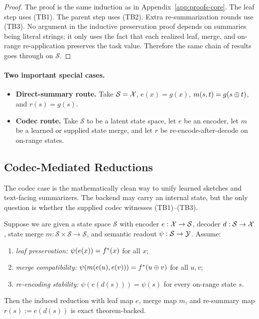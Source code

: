 \begin{proof}
The proof is the same induction as in Appendix~\ref{app:proofs-core}. The leaf
step uses \textup{(TB1)}. The parent step uses \textup{(TB2)}. Extra
re-summarization rounds use \textup{(TB3)}. No argument in the inductive
preservation proof depends on summaries being literal strings; it only uses the
fact that each realized leaf, merge, and on-range re-application preserves the
task value. Therefore the same chain of results goes through on $\mathcal{S}$.
\end{proof}

\paragraph{Two important special cases.}
\begin{itemize}[nosep]
    \item \textbf{Direct-summary route.} Take $\mathcal{S}=\mathcal{X}$,
    $e(x)=g(x)$, $m(s,t)=g(s\oplus t)$, and $r(s)=g(s)$.
    \item \textbf{Codec route.} Take $\mathcal{S}$ to be a latent state space,
    let $e$ be an encoder, let $m$ be a learned or supplied state merge, and
    let $r$ be re-encode-after-decode on on-range states.
\end{itemize}

\subsection{Codec-Mediated Reductions}

The codec case is the mathematically clean way to unify learned sketches and
text-facing summarizers. The backend may carry an internal state, but the only
question is whether the supplied codec witnesses \textup{(TB1)}--\textup{(TB3)}.

\begin{proposition}
\label{prop:codec-is-enough}
Suppose we are given a state space $\mathcal{S}$ with encoder
$e:\mathcal{X}\to\mathcal{S}$, decoder $d:\mathcal{S}\to\mathcal{X}$, state merge
$m:\mathcal{S}\times\mathcal{S}\to\mathcal{S}$, and semantic readout
$\psi:\mathcal{S}\to\mathcal{Y}$. Assume:
\begin{enumerate}[nosep]
    \item \emph{leaf preservation:} $\psi(e(x))=f^{\ast}(x)$ for all $x$;
    \item \emph{merge compatibility:} $\psi(m(e(u),e(v)))=f^{\ast}(u\oplus v)$
    for all $u,v$;
    \item \emph{re-encoding stability:} $\psi(e(d(s)))=\psi(s)$ for every
    on-range state $s$.
\end{enumerate}
Then the induced reduction with leaf map $e$, merge map $m$, and re-summary map
$r(s):=e(d(s))$ is exact theorem-backed.
\end{proposition}

